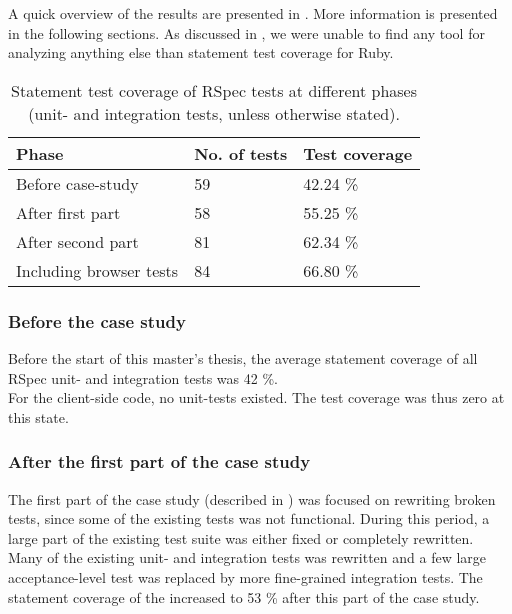 \label{sec:results_coverage}

A quick overview of the results are presented in
. More information is presented in the following
sections. As discussed in , we were unable
to find any tool for analyzing anything else than statement test
coverage for Ruby.\\

\begin{table}[t]
    \centering
    \begin{tabular}{l l l}
        Phase & No. of tests & Test coverage\\
        \hline
        Before case-study &       59 & 42.24 \%\\
        After first part  &       58 & 55.25 \%\\
        After second part &       81 & 62.34 \%\\
        Including browser tests & 84 & 66.80 \%\\
    \end{tabular}
    \caption{ Statement test coverage of RSpec tests at different phases (unit- and integration tests, unless otherwise stated). }
    \label{tab:unit_coverage}
\end{table}

\subsubsection{Before the case study}

Before the start of this master's thesis, the average statement coverage
of all RSpec unit- and integration tests was 42 \%.\\

For the client-side code, no unit-tests existed. The test coverage was
thus zero at this state.\\


\subsubsection{After the first part of the case study}

The first part of the case study (described in )
was focused on rewriting broken tests, since some of the existing tests
was not functional. During this period, a large part of the existing
test suite was either fixed or completely rewritten. Many of the
existing unit- and integration tests was rewritten and a few large
acceptance-level test was replaced by more fine-grained integration
tests. The statement coverage of the increased to 53 \% after this
part of the case study.\\

